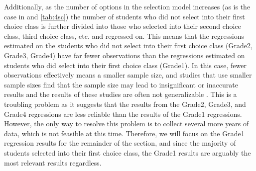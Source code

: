 Additionally, as the number of options in the selection model increases (as is the case in  and \ref{tab:4sc}) the number of students who did not select into their first choice class is further divided into those who selected into their second choice class, third choice class, etc. and regressed on. 
This means that the regressions estimated on the students who did not select into their first choice class (Grade2, Grade3, Grade4) have far fewer observations than the regressions estimated on students who did select into their first choice class (Grade1). 
In this case, fewer observations effectively means a smaller sample size, and studies that use smaller sample sizes find that the sample size may lead to insignificant or inaccurate results \citep{gonzalez2013gibrat} and the results of these studies are often not generalizable \citep{oladipupo2013does}.
This is a troubling problem as it suggests that the results from the Grade2, Grade3, and Grade4 regressions are less reliable than the results of the Grade1 regressions. 
However, the only way to resolve this problem is to collect several more years of data, which is not feasible at this time. 
Therefore, we will focus on the Grade1 regression results for the remainder of the section, and since the majority of students selected into their first choice class, the Grade1 results are arguably the most relevant results regardless. 

